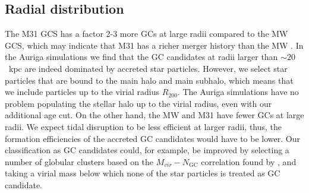 \documentclass[a4paper,fleqn,usenatbib]{mnras}
\begin{document}
\subsection{Radial distribution}
\label{sec:discussion_Rgc}
The M31 GCS has a factor 2-3 more GCs at large radii compared to the MW GCS,
which may indicate that M31 has a richer merger history than the MW 
\citep{2016ApJ...824...42C}. In the Auriga simulations we find that the GC 
candidates at radii larger than ${\sim}20$~kpc are indeed dominated by accreted
star particles. However, we select star particles that are bound to the main 
halo and main subhalo, which means that we include particles up to the virial 
radius $R_{200}$. The Auriga simulations have no problem populating the stellar 
halo up to the virial radius, even with our additional age cut. On the other hand, 
the MW and M31 have fewer GCs at large radii. We expect tidal disruption to be
less efficient at larger radii, thus, the formation efficiencies of the accreted 
GC candidates would have to be lower. Our classification as GC candidates could, 
for example, be improved by selecting a number of globular clusters based on the 
$M_{vir}-N_{\text{GC}}$ correlation found by \citet{2019arXiv190100900B}, and 
taking a virial mass below which none of the star particles is treated as GC candidate.

\end{document}
